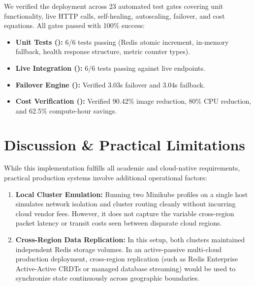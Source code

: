 \documentclass[conference]{IEEEtran}
\begin{document}
We verified the deployment across 23 automated test gates covering unit functionality, live HTTP calls, self-healing, autoscaling, failover, and cost equations. All gates passed with 100\% success:
\begin{itemize}
    \item \textbf{Unit Tests ():} 6/6 tests passing (Redis atomic increment, in-memory fallback, health response structure, metric counter types).
    \item \textbf{Live Integration ():} 6/6 tests passing against live endpoints.
    \item \textbf{Failover Engine ():} Verified 3.03s failover and 3.04s failback.
    \item \textbf{Cost Verification ():} Verified 90.42\% image reduction, 80\% CPU reduction, and 62.5\% compute-hour savings.
\end{itemize}

\section{Discussion \& Practical Limitations}

While this implementation fulfills all academic and cloud-native requirements, practical production systems involve additional operational factors:
\begin{enumerate}
    \item \textbf{Local Cluster Emulation:} Running two Minikube profiles on a single host simulates network isolation and cluster routing cleanly without incurring cloud vendor fees. However, it does not capture the variable cross-region packet latency or transit costs seen between disparate cloud regions.
    \item \textbf{Cross-Region Data Replication:} In this setup, both clusters maintained independent Redis storage volumes. In an active-passive multi-cloud production deployment, cross-region replication (such as Redis Enterprise Active-Active CRDTs or managed database streaming) would be used to synchronize state continuously across geographic boundaries.
\end{enumerate}

\end{document}
